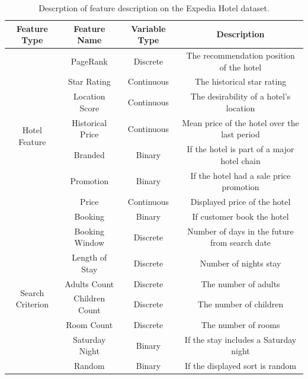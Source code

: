 \documentclass{article} %
\begin{document}
\begin{table}[h!]
\small  %
\setlength{\tabcolsep}{4pt}  %
    \centering
    \begin{tabular}{c|c|c|c}
    \toprule
        Feature Type&Feature Name&  Variable Type& Description\\
        \hline
        \multirow{8}{*}{Hotel Feature} &PageRank & Discrete  & The recommendation position of the hotel\\
        \cline{2-4}
        &Star Rating&  Continuous& The historical star rating\\
        \cline{2-4}
        &Location Score&  Continuous& The desirability of a hotel’s location\\
                \cline{2-4}
        &Historical Price& Continuous &  Mean price of the hotel over the last period\\
                \cline{2-4}
        &Branded&  Binary& If the hotel is part of a major hotel chain\\
                \cline{2-4}
        &Promotion&  Binary& If the hotel had a sale price promotion\\
                \cline{2-4}
        &Price&  Continuous& Displayed price of the hotel \\
                \cline{2-4}
        &Booking &  Binary& If customer book the hotel\\
        \hline
        \multirow{7}{*}{Search Criterion} &Booking Window& Discrete & Number of days in the future from search date\\
                \cline{2-4}
        &Length of Stay&  Discrete&Number of nights stay \\
                \cline{2-4}
        &Adults Count&  Discrete& The number of adults\\
                \cline{2-4}
        &Children Count&  Discrete& The number of children\\
                \cline{2-4}
        &Room Count&  Discrete& The number of rooms\\
                \cline{2-4}
        &Saturday Night&  Binary& If the stay includes a Saturday night\\
                \cline{2-4}
        &Random&  Binary& If the displayed sort is random\\
        \bottomrule
    \end{tabular}
    \caption{Descrption of feature description on the Expedia Hotel dataset.}
    \label{tab:Expedia Dataset Feature}
\end{table}
\end{document}
